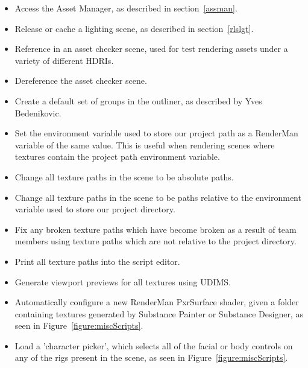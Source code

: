 \documentclass[11pt]{article}
\begin{document}
\begin{itemize}

\item Access the Asset Manager, as described in section~\ref{assman}.

\item Release or cache a lighting scene, as described in section~\ref{rlslgt}.

\item Reference in an asset checker scene, used for test rendering assets under a variety of different HDRIs.

\item Dereference the asset checker scene.

\item Create a default set of groups in the outliner, as described by Yves Bedenikovic.

\item Set the environment variable used to store our project path as a RenderMan variable of the same value. This is useful when rendering scenes where textures contain the project path environment variable.

\item Change all texture paths in the scene to be absolute paths.

\item Change all texture paths in the scene to be paths relative to the environment variable used to store our project directory.

\item Fix any broken texture paths which have become broken as a result of team members using texture paths which are not relative to the project directory.

\item Print all texture paths into the script editor.

\item Generate viewport previews for all textures using UDIMS.

\item Automatically configure a new RenderMan PxrSurface shader, given a folder containing textures generated by Substance Painter or Substance Designer, as seen in Figure~\ref{figure:miscScripts}.

\item Load a 'character picker', which selects all of the facial or body controls on any of the rigs present in the scene, as seen in Figure~\ref{figure:miscScripts}.

\end{itemize}
\end{document}

